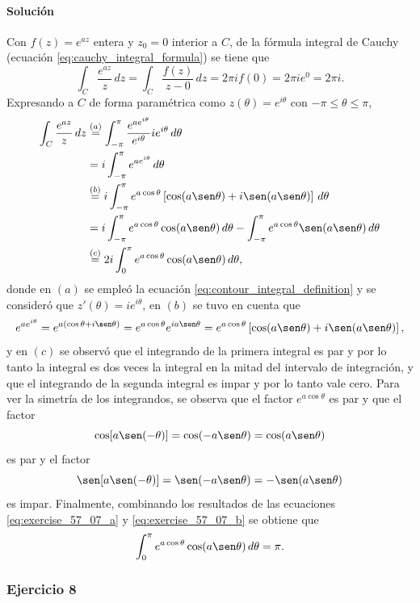 \documentclass[a4paper]{report}
\begin{document}
\paragraph{Solución} Con \(f(z)=e^{az}\) entera y \(z_0=0\) interior a \(C\), de la fórmula integral de Cauchy (ecuación \ref{eq:cauchy_integral_formula}) se tiene que 
\begin{equation}\label{eq:exercise_57_07_a}
 \int_C\frac{e^{az}}{z}\,dz=\int_C\frac{f(z)}{z-0}\,dz=2\pi if(0)=2\pi ie^0=2\pi i. 
\end{equation}
Expresando a \(C\) de forma paramétrica como \(z(\theta)=e^{i\theta}\) con \(-\pi\leq\theta\leq\pi\),
\begin{align}
 \int_C\frac{e^{az}}{z}\,dz&\overset{(a)}{=}\int_{-\pi}^\pi\frac{e^{ae^{i\theta}}}{e^{i\theta}}ie^{i\theta}\,d\theta\nonumber\\
  &=i\int_{-\pi}^\pi e^{ae^{i\theta}}\,d\theta\nonumber\\
  &\overset{(b)}{=}i\int_{-\pi}^\pi e^{a\cos\theta}\left[\cos(a\sen\theta)+i\sen(a\sen\theta)\right]\,d\theta\nonumber\\
  &=i\int_{-\pi}^\pi e^{a\cos\theta}\cos(a\sen\theta)\,d\theta-\int_{-\pi}^\pi e^{a\cos\theta}\sen(a\sen\theta)\,d\theta\nonumber\\
  &\overset{(c)}{=}2i\int_{0}^\pi e^{a\cos\theta}\cos(a\sen\theta)\,d\theta,\label{eq:exercise_57_07_b}
\end{align}
donde en \((a)\) se empleó la ecuación \ref{eq:contour_integral_definition} y se consideró que \(z'(\theta)=ie^{i\theta}\), en \((b)\) se tuvo en cuenta que 
\[
 e^{ae^{i\theta}}=e^{a(\cos\theta+i\sen\theta)}=e^{a\cos\theta}e^{ia\sen\theta}=
 e^{a\cos\theta}\left[\cos(a\sen\theta)+i\sen(a\sen\theta)\right],
\]
y en \((c)\) se observó que el integrando de la primera integral es par y por lo tanto la integral es dos veces la integral en la mitad del intervalo de integración, y que el integrando de la segunda integral es impar y por lo tanto vale cero. Para ver la simetría de los integrandos, se observa que el factor \(e^{a\cos\theta}\) es par y que el factor
\[
 \cos[a\sen(-\theta)]=\cos(-a\sen\theta)=\cos(a\sen\theta)
\]
es par y el factor 
\[
 \sen[a\sen(-\theta)]=\sen(-a\sen\theta)=-\sen(a\sen\theta)
\]
es impar. Finalmente, combinando los resultados de las ecuaciones \ref{eq:exercise_57_07_a} y \ref{eq:exercise_57_07_b} se obtiene que 
\[
 \int_{0}^\pi e^{a\cos\theta}\cos(a\sen\theta)\,d\theta=\pi.
\]

\subsubsection*{Ejercicio 8}
\end{document}
